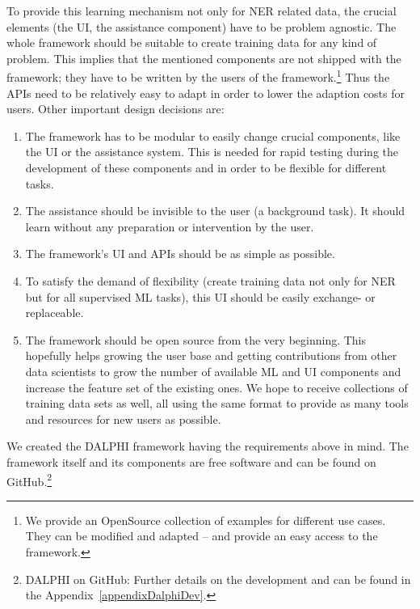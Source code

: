 		To provide this learning mechanism not only for \ac{NER} related data, the crucial elements (the \ac{UI}, the assistance component) have to be problem agnostic. The whole framework should be suitable to create training data for any kind of problem. This implies that the mentioned components are not shipped with the framework; they have to be written by the users of the framework.\footnote{We provide an OpenSource collection of examples for different use cases. They can be modified and adapted -- and provide an easy access to the framework.} Thus the \ac{API}s need to be relatively easy to adapt in order to lower the adaption costs for users. Other important design decisions are:

		\begin{enumerate}
			\item The framework has to be modular to easily change crucial components, like the \ac{UI} or the assistance system. This is needed for rapid testing during the development of these components and in order to be flexible for different tasks.
			\item The assistance should be invisible to the user (a background task). It should learn without any preparation or intervention by the user.
			\item The framework's \ac{UI} and \ac{API}s should be as simple as possible.
			\item To satisfy the demand of flexibility (create training data not only for \ac{NER} but for all supervised \ac{ML} tasks), this \ac{UI} should be easily exchange- or replaceable.
			\item The framework should be open source from the very beginning. This hopefully helps growing the user base and getting contributions from other data scientists to grow the number of available \ac{ML} and \ac{UI} components and increase the feature set of the existing ones. We hope to receive collections of training data sets as well, all using the same format to provide as many tools and resources for new users as possible.
		\end{enumerate}

		We created the \ac{DALPHI} framework having the requirements above in mind. The framework itself and its components are free software and can be found on GitHub.\footnote{\ac{DALPHI} on GitHub:  Further details on the development and can be found in the Appendix~\ref{appendixDalphiDev}.}

